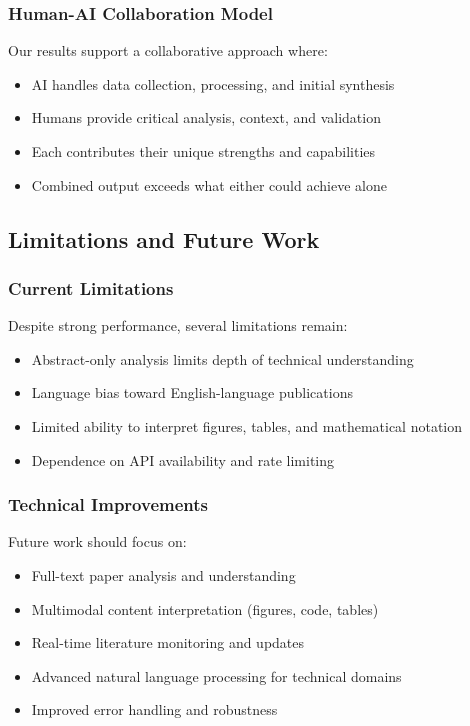 \subsubsection{Human-AI Collaboration Model}

Our results support a collaborative approach where:
\begin{itemize}
    \item AI handles data collection, processing, and initial synthesis
    \item Humans provide critical analysis, context, and validation
    \item Each contributes their unique strengths and capabilities
    \item Combined output exceeds what either could achieve alone
\end{itemize}

\subsection{Limitations and Future Work}

\subsubsection{Current Limitations}

Despite strong performance, several limitations remain:
\begin{itemize}
    \item Abstract-only analysis limits depth of technical understanding
    \item Language bias toward English-language publications
    \item Limited ability to interpret figures, tables, and mathematical notation
    \item Dependence on API availability and rate limiting
\end{itemize}

\subsubsection{Technical Improvements}

Future work should focus on:
\begin{itemize}
    \item Full-text paper analysis and understanding
    \item Multimodal content interpretation (figures, code, tables)
    \item Real-time literature monitoring and updates
    \item Advanced natural language processing for technical domains
    \item Improved error handling and robustness
\end{itemize}


